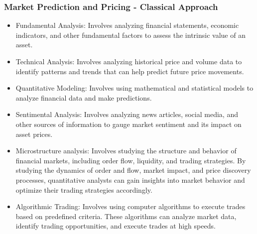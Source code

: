 \documentclass{beamer}
\begin{document}
\begin{frame}
	\frametitle{Market Prediction and Pricing - Classical Approach}
	\begin{itemize}
		\item Fundamental Analysis: Involves analyzing financial statements, economic indicators, and other fundamental factors to assess the intrinsic value of an asset.
		\item Technical Analysis: Involves analyzing historical price and volume data to identify patterns and trends that can help predict future price movements.
		\item Quantitative Modeling: Involves using mathematical and statistical models to analyze financial data and make predictions.
		\item Sentimental Analysis: Involves analyzing news articles, social media, and other sources of information to gauge market sentiment and its impact on asset prices.
	\end{itemize}
\end{frame}

\begin{frame}
	\begin{itemize}
		\item Microstructure analysis: Involves studying the structure and behavior of financial markets, including order flow, liquidity, and trading strategies.  By studying the dynamics of order and flow, market impact, and price discovery processes, quantitative analysts can gain insights into market behavior and optimize their trading strategies accordingly.
		\item Algorithmic Trading: Involves using computer algorithms to execute trades based on predefined criteria. These algorithms can analyze market data, identify trading opportunities, and execute trades at high speeds.
	\end{itemize}
\end{frame}
\end{document}
